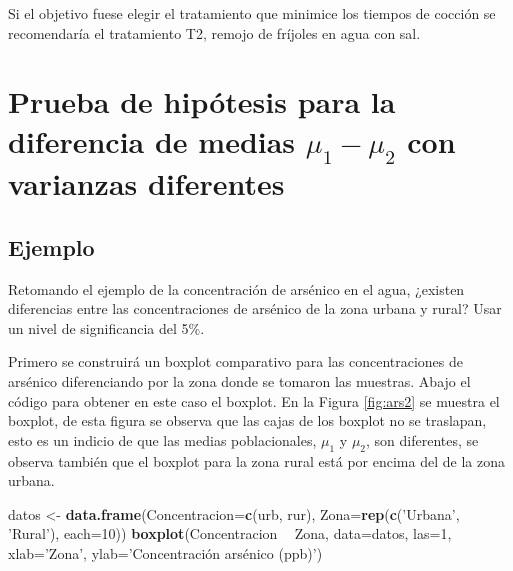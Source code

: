 \documentclass[10pt,]{krantz}
\makeatletter
\newenvironment{Shaded}{\begin{snugshade}}{\end{snugshade}}
\newcommand{\KeywordTok}[1]{\textcolor[rgb]{0.13,0.29,0.53}{\textbf{#1}}}
\newcommand{\DataTypeTok}[1]{\textcolor[rgb]{0.13,0.29,0.53}{#1}}
\newcommand{\DecValTok}[1]{\textcolor[rgb]{0.00,0.00,0.81}{#1}}
\newcommand{\StringTok}[1]{\textcolor[rgb]{0.31,0.60,0.02}{#1}}
\newcommand{\OperatorTok}[1]{\textcolor[rgb]{0.81,0.36,0.00}{\textbf{#1}}}
\newcommand{\NormalTok}[1]{#1}
\newenvironment{kframe}{%
\medskip{}
\setlength{\fboxsep}{.8em}
 \def\at@end@of@kframe{}%
 \ifinner\ifhmode%
  \def\at@end@of@kframe{\end{minipage}}%
  \begin{minipage}{\columnwidth}%
 \fi\fi%
 \def\FrameCommand##1{\hskip\@totalleftmargin \hskip-\fboxsep
 \colorbox{shadecolor}{##1}\hskip-\fboxsep
     \hskip-\linewidth \hskip-\@totalleftmargin \hskip\columnwidth}%
 \MakeFramed {\advance\hsize-\width
   \@totalleftmargin\z@ \linewidth\hsize
   \@setminipage}}%
 {\par\unskip\endMakeFramed%
 \at@end@of@kframe}
\renewenvironment{Shaded}{\begin{kframe}}{\end{kframe}}
\makeatother
\begin{document}
Si el objetivo fuese elegir el tratamiento que minimice los tiempos de
cocción se recomendaría el tratamiento T2, remojo de fríjoles en agua
con sal.

\section{\texorpdfstring{Prueba de hipótesis para la diferencia de
medias \(\mu_1-\mu_2\) con varianzas
diferentes}{Prueba de hipótesis para la diferencia de medias \textbackslash{}mu\_1-\textbackslash{}mu\_2 con varianzas diferentes}}\label{prueba-de-hipotesis-para-la-diferencia-de-medias-mu_1-mu_2-con-varianzas-diferentes}

\subsection*{Ejemplo}\label{ejemplo-72}


Retomando el ejemplo de la concentración de arsénico en el agua,
¿existen diferencias entre las concentraciones de arsénico de la zona
urbana y rural? Usar un nivel de significancia del 5\%.

Primero se construirá un boxplot comparativo para las concentraciones de
arsénico diferenciando por la zona donde se tomaron las muestras. Abajo
el código para obtener en este caso el boxplot. En la Figura
\ref{fig:ars2} se muestra el boxplot, de esta figura se observa que las
cajas de los boxplot no se traslapan, esto es un indicio de que las
medias poblacionales, \(\mu_1\) y \(\mu_2\), son diferentes, se observa
también que el boxplot para la zona rural está por encima del de la zona
urbana.

\begin{Shaded}
\begin{Highlighting}[]
\NormalTok{datos <-}\StringTok{ }\KeywordTok{data.frame}\NormalTok{(}\DataTypeTok{Concentracion=}\KeywordTok{c}\NormalTok{(urb, rur),}
                    \DataTypeTok{Zona=}\KeywordTok{rep}\NormalTok{(}\KeywordTok{c}\NormalTok{(}\StringTok{'Urbana'}\NormalTok{, }\StringTok{'Rural'}\NormalTok{), }\DataTypeTok{each=}\DecValTok{10}\NormalTok{))}
\KeywordTok{boxplot}\NormalTok{(Concentracion }\OperatorTok{~}\StringTok{ }\NormalTok{Zona, }\DataTypeTok{data=}\NormalTok{datos, }\DataTypeTok{las=}\DecValTok{1}\NormalTok{,}
        \DataTypeTok{xlab=}\StringTok{'Zona'}\NormalTok{, }\DataTypeTok{ylab=}\StringTok{'Concentración arsénico (ppb)'}\NormalTok{)}
\end{Highlighting}
\end{Shaded}
\end{document}
